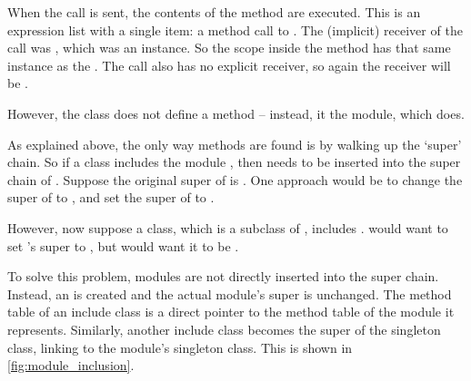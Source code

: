 When the  call is sent, the contents of the  method are executed. This is an expression list with a single item: a method call to . The (implicit) receiver of the  call was , which was an  instance. So the scope inside the method has that same  instance as the . The  call also has no explicit receiver, so again the receiver will be .

However, the  class does not define a  method -- instead, it  the  module, which does.

As explained above, the only way methods are found is by walking up the `super' chain. So if a class  includes the module , then  needs to be inserted into the super chain of . Suppose the original super of  is . One approach would be to change the super of  to , and set the super of  to .

However, now suppose a  class, which is a subclass of , includes .  would want to set 's super to , but  would want it to be .

To solve this problem, modules are not directly inserted into the super chain. Instead, an  is created and the actual module's super is unchanged. The method table of an include class is a direct pointer to the method table of the module it represents. Similarly, another include class becomes the super of the singleton class, linking to the module's singleton class. This is shown in \autoref{fig:module_inclusion}.

